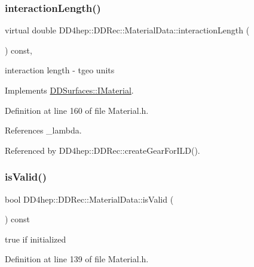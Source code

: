 \subsubsection{\texorpdfstring{interaction\+Length()}{interactionLength()}}
{\footnotesize\ttfamily virtual double D\+D4hep\+::\+D\+D\+Rec\+::\+Material\+Data\+::interaction\+Length (\begin{DoxyParamCaption}{ }\end{DoxyParamCaption}) const\hspace{0.3cm}{\ttfamily [inline]}, {\ttfamily [virtual]}}



interaction length -\/ tgeo units 



Implements \hyperlink{class_d_d_surfaces_1_1_i_material_a9217c1bc6b4c5562893c4249967cf64d}{D\+D\+Surfaces\+::\+I\+Material}.



Definition at line 160 of file Material.\+h.



References \+\_\+lambda.



Referenced by D\+D4hep\+::\+D\+D\+Rec\+::create\+Gear\+For\+I\+L\+D().

\hypertarget{class_d_d4hep_1_1_d_d_rec_1_1_material_data_a143de076ff337b20c79be079294c2942}{}\label{class_d_d4hep_1_1_d_d_rec_1_1_material_data_a143de076ff337b20c79be079294c2942} 
\subsubsection{\texorpdfstring{is\+Valid()}{isValid()}}
{\footnotesize\ttfamily bool D\+D4hep\+::\+D\+D\+Rec\+::\+Material\+Data\+::is\+Valid (\begin{DoxyParamCaption}{ }\end{DoxyParamCaption}) const\hspace{0.3cm}{\ttfamily [inline]}}



true if initialized 



Definition at line 139 of file Material.\+h.

\hypertarget{class_d_d4hep_1_1_d_d_rec_1_1_material_data_a9e78435056d6908a5521176548461cc2}{}\label{class_d_d4hep_1_1_d_d_rec_1_1_material_data_a9e78435056d6908a5521176548461cc2} 
